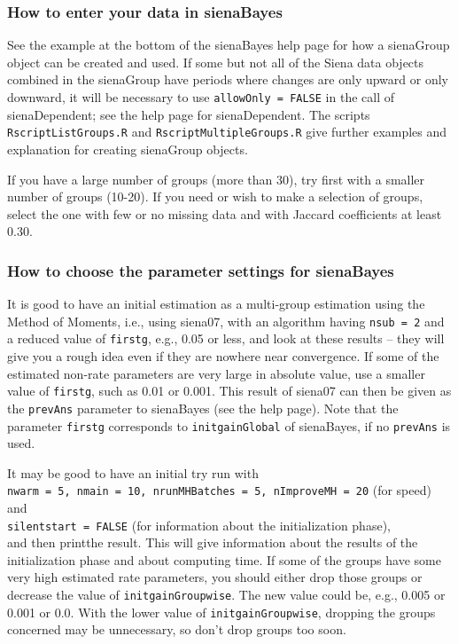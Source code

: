 \documentclass[a4paper,fleqn,11pt]{article}
\newcommand{\+}{\, + \,}
\newcommand{\sfn}[1]{\textsf{#1}}
\begin{document}
\subsubsection{How to enter your data in sienaBayes}

See the example at the bottom of the \textsf{sienaBayes} help page for how a
\sfn{sienaGroup} object can be created and used.
If some but not all of the Siena data objects combined in the \sfn{sienaGroup} have
periods where changes are only upward or only downward,
it will be necessary to use \texttt{allowOnly = FALSE} in the call of
\textsf{sienaDependent}; see the help page for \textsf{sienaDependent}.
The scripts \texttt{RscriptListGroups.R} and \texttt{RscriptMultipleGroups.R}
give further examples and explanation for creating \sfn{sienaGroup} objects.

If you have a large number of groups (more than 30), try first
with a smaller number of groups (10-20). If you need or wish to
make a selection of groups, select the one with few or no missing data and
with Jaccard coefficients at least 0.30.

\subsubsection{How to choose the parameter settings for sienaBayes}
\label{S_sienaBayesParameters}

It is good to have an initial estimation as a multi-group estimation
using the Method of Moments, i.e., using \textsf{siena07}, with
an algorithm having
\texttt{nsub = 2} and a reduced value of \texttt{firstg}, e.g.,
0.05 or less, and look at these results --
they will give you a rough idea even if they are nowhere near convergence.
If some of the estimated non-rate parameters are very large
in absolute value, use a smaller value of \texttt{firstg}, such as 0.01 or 0.001.
This result of  \textsf{siena07} can then be given as the \texttt{prevAns}
parameter to \textsf{sienaBayes} (see the help page).
Note that the parameter \texttt{firstg} corresponds to \texttt{initgainGlobal}
of \textsf{sienaBayes}, if no  \texttt{prevAns} is used.

It may be good to have an initial try run with\\
\texttt{nwarm = 5, nmain = 10, nrunMHBatches = 5, nImproveMH = 20}
(for speed) \\
and \\
\texttt{silentstart = FALSE} (for information about the
initialization phase),\\
and then \textsf{print}the result.
This will give information about the results of the initialization
phase and about computing time. If some of the groups have some very
high estimated rate parameters, you should either drop those groups
or decrease the value of \texttt{initgainGroupwise}.
The new value could be, e.g., 0.005 or 0.001 or 0.0. With the lower value
of \texttt{initgainGroupwise}, dropping the groups concerned may be unnecessary,
so don't drop groups too soon.
\end{document}

